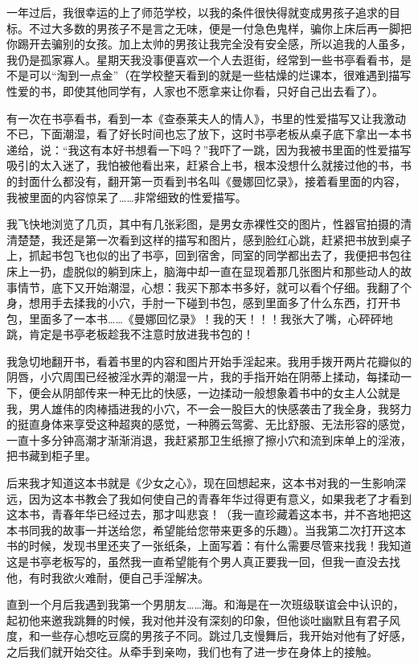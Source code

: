 \documentclass[12pt,UTF8]{ctexbook}
\begin{document}
一年过后，我很幸运的上了师范学校，以我的条件很快得就变成男孩子追求的目标。不过大多数的男孩子不是言之无味，便是一付急色鬼样，骗你上床后再一脚把你踢开去骗别的女孩。加上太帅的男孩让我完全没有安全感，所以追我的人虽多，我仍是孤家寡人。星期天我没事便喜欢一个人去逛街，经常到一些书亭看看书，是不是可以“淘到一点金”（在学校整天看到的就是一些枯燥的烂课本，很难遇到描写性爱的书，即使其他同学有，人家也不愿拿来让你看，只好自己出去看了）。

有一次在书亭看书，看到一本《查泰莱夫人的情人》，书里的性爱描写又让我激动不已，下面潮湿，看了好长时间也忘了放下，这时书亭老板从桌子底下拿出一本书递给，说：“我这有本好书想看一下吗？”我吓了一跳，因为我被书里面的性爱描写吸引的太入迷了，我怕被他看出来，赶紧合上书，根本没想什么就接过他的书，书的封面什么都没有，翻开第一页看到书名叫《曼娜回忆录》，接着看里面的内容，我被里面的内容惊呆了……非常细致的性爱描写。

我飞快地浏览了几页，其中有几张彩图，是男女赤裸性交的图片，性器官拍摄的清清楚楚，我还是第一次看到这样的描写和图片，感到脸红心跳，赶紧把书放到桌子上，抓起书包飞也似的出了书亭，回到宿舍，同室的同学都出去了，我便把书包往床上一扔，虚脱似的躺到床上，脑海中却一直在显现着那几张图片和那些动人的故事情节，底下又开始潮湿，心想：我买下那本书多好，就可以看个仔细。我翻了个身，想用手去揉我的小穴，手肘一下碰到书包，感到里面多了什么东西，打开书包，里面多了一本书……《曼娜回忆录》！我的天！！！我张大了嘴，心砰砰地跳，肯定是书亭老板趁我不注意时放进我书包的！

我急切地翻开书，看着书里的内容和图片开始手淫起来。我用手拨开两片花瓣似的阴唇，小穴周围已经被淫水弄的潮湿一片，我的手指开始在阴蒂上揉动，每揉动一下，便会从阴部传来一种无比的快感，一边揉动一般想象着书中的女主人公就是我，男人雄伟的肉棒插进我的小穴，不一会一股巨大的快感袭击了我全身，我努力的挺直身体来享受这种超爽的感觉，一种腾云驾雾、无比舒服、无法形容的感觉，一直十多分钟高潮才渐渐消退，我赶紧那卫生纸擦了擦小穴和流到床单上的淫液，把书藏到柜子里。

后来我才知道这本书就是《少女之心》，现在回想起来，这本书对我的一生影响深远，因为这本书教会了我如何使自己的青春年华过得更有意义，如果我老了才看到这本书，青春年华已经过去，那才叫悲哀！（我一直珍藏着这本书，并不吝地把这本书同我的故事一并送给您，希望能给您带来更多的乐趣）。当我第二次打开这本书的时候，发现书里还夹了一张纸条，上面写着：有什么需要尽管来找我！我知道这是书亭老板写的，虽然我一直希望能有个男人真正要我一回，但我一直没去找他，有时我欲火难耐，便自己手淫解决。

直到一个月后我遇到我第一个男朋友……海。和海是在一次班级联谊会中认识的，起初他来邀我跳舞的时候，我对他并没有深刻的印象，但他谈吐幽默且有君子风度，和一些存心想吃豆腐的男孩子不同。跳过几支慢舞后，我开始对他有了好感，之后我们就开始交往。从牵手到亲吻，我们也有了进一步在身体上的接触。
\end{document}
